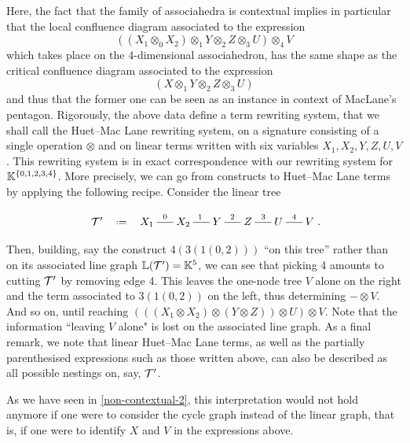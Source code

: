 Here, the fact that the family of associahedra is contextual implies in particular that the local confluence diagram associated to the expression
$$((X_1\otimes_0 X_2)\otimes_1 Y\otimes_2 Z\otimes_3 U)\otimes_4 V $$
which takes place on the $4$-dimensional associahedron, has the same shape as the critical confluence diagram associated to the expression
$$ (X \otimes_1 Y \otimes_2 Z \otimes_3 U)$$
and thus that the former one can be seen as an instance in context of MacLane's pentagon.  
Rigorously, the above data define a term rewriting system, that we shall call the Huet--Mac Lane rewriting system, on a signature consisting of a single operation $\otimes$ and on linear terms written with six variables  $X_1,X_2,Y,Z,U,V$. 
This rewriting system is in exact correspondence with our rewriting system for  ${\mathbb K}^{\left\{0,1,2,3,4\right\}}$. 
More precisely, we can go from constructs to  Huet--Mac Lane terms by applying the following recipe. 
Consider the linear tree 
\vspace{-.7cm}
\begin{center}
$$\xymatrix @-1.65pc {{\cal T}' & \eqdef  &X_1 \ar @{-}[rr]^{0}&& X_2 \ar @{-}[rr]^{1}&& Y \ar @{-}[rr]^{2}&& Z \ar @{-}[rr]^{3}&& U \ar @{-}[rr]^{4}&& V}.
  $$
  \end{center}
Then, building, say the construct $4(3(1(0,2)))$ ``on this tree'' rather than on its associated  line graph $\mathbb{L}({\cal T}')={\mathbb K}^5$, we can see that picking 4 amounts to cutting $\cal T'$ by removing edge 4. This leaves  the one-node tree $V$ alone on the right and the term associated to $3(1(0,2))$ on the left, thus determining $-\otimes V$. And so on, until reaching $( ((X_1\otimes X_2)\otimes  (Y\otimes Z))\otimes U)\otimes V $. 
Note that the information ``leaving $V$ alone" is lost on the associated line graph. 
As a final remark, we note that linear Huet--Mac Lane terms, as well as the  partially parenthesised expressions such as those written above, can also be described as all possible nestings on, say, ${\cal T'}$.

As we have seen in \cref{non-contextual-2}, this interpretation would not hold anymore if one were to consider the cycle graph instead of the linear graph, that is, if one were to identify $X$ and $V$ in the expressions above. 


